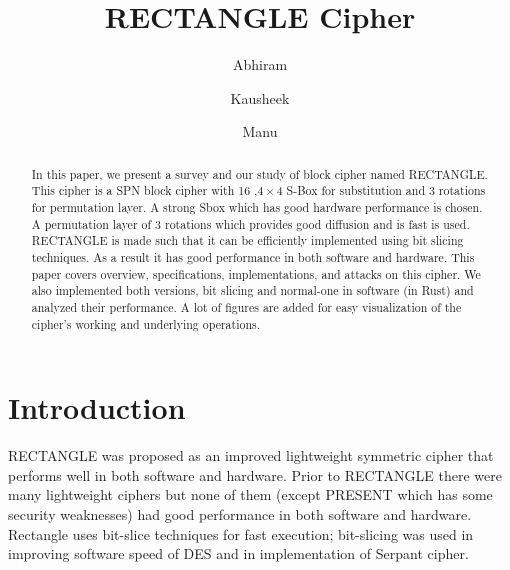 \documentclass[final]{transcrypto}
\begin{document}
\title[RECTANGLE Cipher]{RECTANGLE Cipher}

\author{Abhiram \and Kausheek \and Manu}
\setDOI{}

\begin{abstract}
In this paper, we present a survey and our study of block cipher named RECTANGLE. This cipher is a SPN block cipher with 16 ,$4\times 4$ S-Box for substitution and 3 rotations for permutation layer. A strong Sbox which has good hardware performance is chosen. A permutation layer of 3 rotations which provides good diffusion and is fast is used. RECTANGLE is made such that it can be efficiently implemented using bit slicing techniques. As a result it has good performance in both software and hardware. This paper covers overview, specifications, implementations, and attacks on this cipher. We also implemented both versions, bit slicing and normal-one in software (in Rust) and analyzed their performance. A lot of figures are added for easy visualization of the cipher's working and underlying operations.
\end{abstract}
\maketitle
\section{Introduction}
RECTANGLE was proposed as an improved lightweight symmetric cipher that performs well in both software and hardware.\cite{rectangle} Prior to RECTANGLE there were many lightweight ciphers but none of them (except PRESENT which has some security weaknesses)\cite{present} had good performance in both software and hardware. Rectangle uses bit-slice techniques for fast execution; bit-slicing was used in improving software speed of DES and in implementation of Serpant cipher\cite{bit1}\cite{bit2}.
\end{document}
